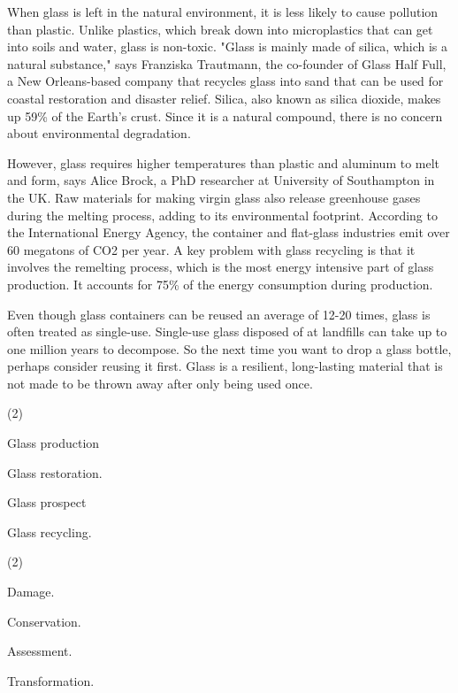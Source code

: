 \documentclass{英语试卷}
\begin{document}
\par When glass is left in the natural environment, it is less likely to cause pollution than plastic. Unlike plastics, which break down into microplastics that can get into soils and water, glass is non-toxic. "Glass is mainly made of silica, which is a natural substance," says Franziska Trautmann, the co-founder of Glass Half Full, a New Orleans-based company that recycles glass into sand that can be used for coastal restoration and disaster relief. Silica, also known as silica dioxide, makes up 59\% of the Earth's crust. Since it is a natural compound, there is no concern about environmental degradation.\par
\par However, glass requires higher temperatures than plastic and aluminum to melt and form, says Alice Brock, a PhD researcher at University of Southampton in the UK. Raw materials for making virgin glass also release greenhouse gases during the melting process, adding to its environmental footprint. According to the International Energy Agency, the container and flat-glass industries emit over 60 megatons of CO2 per year. A key problem with glass recycling is that it involves the remelting process, which is the most energy intensive part of glass production. It accounts for 75\% of the energy consumption during production.\par
\par Even though glass containers can be reused an average of 12-20 times, glass is often treated as single-use. Single-use glass disposed of at landfills can take up to one million years to decompose. So the next time you want to drop a glass bottle, perhaps consider reusing it first. Glass is a resilient, long-lasting material that is not made to be thrown away after only being used once.\par
{}
\begin{choices}(2)
  \item Glass production
  \item Glass restoration.
  \item Glass prospect
  \item Glass recycling.
\end{choices}
\begin{choices}(2)
  \item Damage.
  \item Conservation.
  \item Assessment.
  \item Transformation.
\end{choices}
\end{document}
